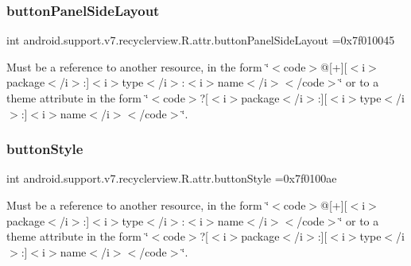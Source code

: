 \subsubsection{\texorpdfstring{button\+Panel\+Side\+Layout}{buttonPanelSideLayout}}
{\footnotesize\ttfamily int android.\+support.\+v7.\+recyclerview.\+R.\+attr.\+button\+Panel\+Side\+Layout =0x7f010045\hspace{0.3cm}{\ttfamily [static]}}

Must be a reference to another resource, in the form \char`\"{}$<$code$>$@\mbox{[}+\mbox{]}\mbox{[}$<$i$>$package$<$/i$>$\+:\mbox{]}$<$i$>$type$<$/i$>$\+:$<$i$>$name$<$/i$>$$<$/code$>$\char`\"{} or to a theme attribute in the form \char`\"{}$<$code$>$?\mbox{[}$<$i$>$package$<$/i$>$\+:\mbox{]}\mbox{[}$<$i$>$type$<$/i$>$\+:\mbox{]}$<$i$>$name$<$/i$>$$<$/code$>$\char`\"{}. \mbox{\label{classandroid_1_1support_1_1v7_1_1recyclerview_1_1R_1_1attr_abb64edc003d10793d848b67f4f7b4deb}} 
\subsubsection{\texorpdfstring{button\+Style}{buttonStyle}}
{\footnotesize\ttfamily int android.\+support.\+v7.\+recyclerview.\+R.\+attr.\+button\+Style =0x7f0100ae\hspace{0.3cm}{\ttfamily [static]}}

Must be a reference to another resource, in the form \char`\"{}$<$code$>$@\mbox{[}+\mbox{]}\mbox{[}$<$i$>$package$<$/i$>$\+:\mbox{]}$<$i$>$type$<$/i$>$\+:$<$i$>$name$<$/i$>$$<$/code$>$\char`\"{} or to a theme attribute in the form \char`\"{}$<$code$>$?\mbox{[}$<$i$>$package$<$/i$>$\+:\mbox{]}\mbox{[}$<$i$>$type$<$/i$>$\+:\mbox{]}$<$i$>$name$<$/i$>$$<$/code$>$\char`\"{}. \mbox{\label{classandroid_1_1support_1_1v7_1_1recyclerview_1_1R_1_1attr_a56d49d09fb4efe84d271cb3f473a2802}} 
